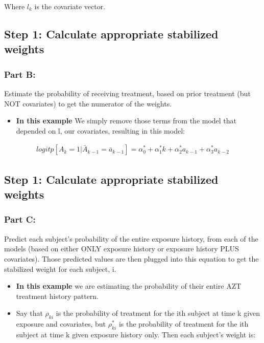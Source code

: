 \documentclass[]{article}
\providecommand{\tightlist}{%
  \setlength{\itemsep}{0pt}\setlength{\parskip}{0pt}}
\begin{document}
Where \(l_k\) is the covariate vector.

\subsection{Step 1: Calculate appropriate stabilized
weights}\label{step-1-calculate-appropriate-stabilized-weights-1}

\subsubsection{Part B:}\label{part-b}

Estimate the probability of receiving treatment, based on prior
treatment (but NOT covariates) to get the numerator of the weights.

\begin{itemize}
\tightlist
\item
  \textbf{In this example} We simply remove those terms from the model
  that depended on l, our covariates, resulting in this model:
\end{itemize}

\begin{align*}
logit p[A_k = 1| \bar{A}_{k-1} = \bar{a}_{k-1}] = \alpha_0^* + \alpha_1^*k + \alpha_2^*a_{k-1} + \alpha_3^*a_{k-2}
\end{align*}

\subsection{Step 1: Calculate appropriate stabilized
weights}\label{step-1-calculate-appropriate-stabilized-weights-2}

\subsubsection{Part C:}\label{part-c}

Predict each subject's probability of the entire exposure history, from
each of the models (based on either ONLY exposure history or exposure
history PLUS covariates). Those predicted values are then plugged into
this equation to get the stabilized weight for each subject, i.

\begin{itemize}
\item
  \textbf{In this example} we are estimating the probability of their
  entire AZT treatment history pattern.
\item
  Say that \(\rho_{ki}\) is the probability of treatment for the ith
  subject at time k given exposure and covariates, but \(\rho_{ki}^*\)
  is the probability of treatment for the ith subject at time k given
  exposure history only. Then each subject's weight is:
\end{itemize}
\end{document}
